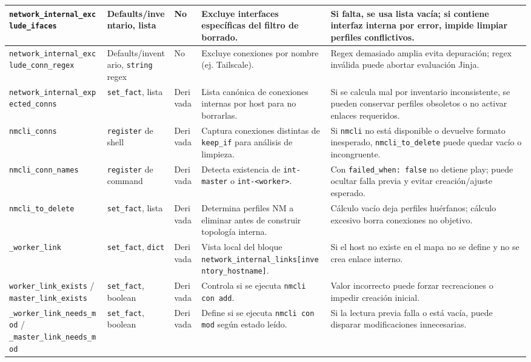 \begin{longtable}{|>{\raggedright\arraybackslash}p{3.0cm}|>{\raggedright\arraybackslash}p{2.9cm}|>{\raggedright\arraybackslash}p{2.4cm}|>{\raggedright\arraybackslash}p{3.8cm}|>{\raggedright\arraybackslash}p{3.8cm}|}
\hline
\texttt{network\_internal\_exclude\_ifaces} & Defaults/inventario, lista & No & Excluye interfaces específicas del filtro de borrado. & Si falta, se usa lista vacía; si contiene interfaz interna por error, impide limpiar perfiles conflictivos. \\
\hline
\texttt{network\_internal\_exclude\_conn\_regex} & Defaults/inventario, \texttt{string} regex & No & Excluye conexiones por nombre (ej. Tailscale). & Regex demasiado amplia evita depuración; regex inválida puede abortar evaluación Jinja. \\
\hline
\texttt{network\_internal\_expected\_conns} & \texttt{set\_fact}, lista & Derivada & Lista canónica de conexiones internas por host para no borrarlas. & Si se calcula mal por inventario inconsistente, se pueden conservar perfiles obsoletos o no activar enlaces requeridos. \\
\hline
\texttt{nmcli\_conns} & \texttt{register} de shell & Derivada & Captura conexiones distintas de \texttt{keep\_if} para análisis de limpieza. & Si \texttt{nmcli} no está disponible o devuelve formato inesperado, \texttt{nmcli\_to\_delete} puede quedar vacío o incongruente. \\
\hline
\texttt{nmcli\_conn\_names} & \texttt{register} de command & Derivada & Detecta existencia de \texttt{int-master} o \texttt{int-<worker>}. & Con \texttt{failed\_when: false} no detiene play; puede ocultar falla previa y evitar creación/ajuste esperado. \\
\hline
\texttt{nmcli\_to\_delete} & \texttt{set\_fact}, lista & Derivada & Determina perfiles NM a eliminar antes de construir topología interna. & Cálculo vacío deja perfiles huérfanos; cálculo excesivo borra conexiones no objetivo. \\
\hline
\texttt{\_worker\_link} & \texttt{set\_fact}, \texttt{dict} & Derivada & Vista local del bloque \texttt{network\_internal\_links[inventory\_hostname]}. & Si el host no existe en el mapa no se define y no se crea enlace interno. \\
\hline
\texttt{worker\_link\_exists} / \texttt{master\_link\_exists} & \texttt{set\_fact}, boolean & Derivada & Controla si se ejecuta \texttt{nmcli con add}. & Valor incorrecto puede forzar recreaciones o impedir creación inicial. \\
\hline
\texttt{\_worker\_link\_needs\_mod} / \texttt{\_master\_link\_needs\_mod} & \texttt{set\_fact}, boolean & Derivada & Define si se ejecuta \texttt{nmcli con mod} según estado leído. & Si la lectura previa falla o está vacía, puede disparar modificaciones innecesarias. \\

\end{longtable}
